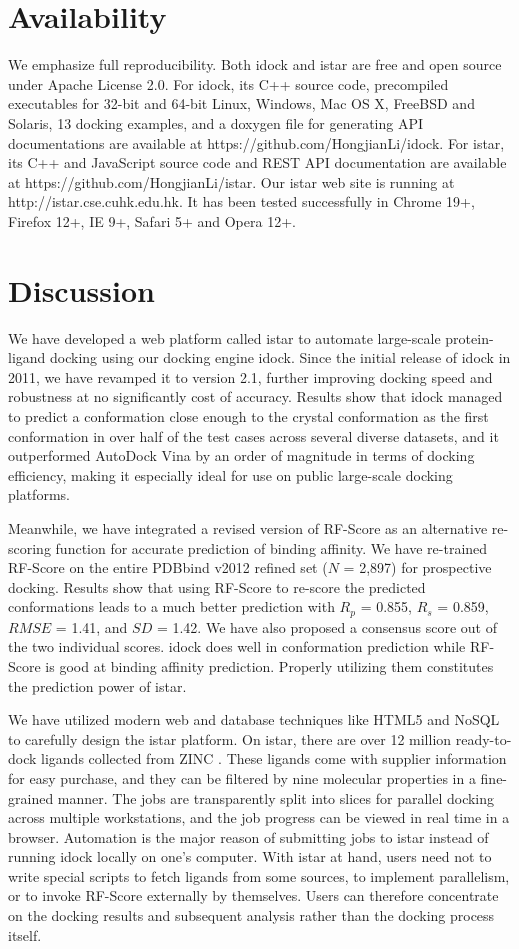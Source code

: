 \documentclass[10pt]{article}
\begin{document}
\section*{Availability}
We emphasize full reproducibility. Both idock and istar are free and open source under Apache License 2.0. For idock, its C++ source code, precompiled executables for 32-bit and 64-bit Linux, Windows, Mac OS X, FreeBSD and Solaris, 13 docking examples, and a doxygen file for generating API documentations are available at https://github.com/HongjianLi/idock. For istar, its C++ and JavaScript source code and REST API documentation are available at https://github.com/HongjianLi/istar. Our istar web site is running at http://istar.cse.cuhk.edu.hk. It has been tested successfully in Chrome 19+, Firefox 12+, IE 9+, Safari 5+ and Opera 12+.

\section*{Discussion}
We have developed a web platform called istar to automate large-scale protein-ligand docking using our docking engine idock. Since the initial release of idock in 2011, we have revamped it to version 2.1, further improving docking speed and robustness at no significantly cost of accuracy. Results show that idock managed to predict a conformation close enough to the crystal conformation as the first conformation in over half of the test cases across several diverse datasets, and it outperformed AutoDock Vina by an order of magnitude in terms of docking efficiency, making it especially ideal for use on public large-scale docking platforms.

Meanwhile, we have integrated a revised version of RF-Score as an alternative re-scoring function for accurate prediction of binding affinity. We have re-trained RF-Score on the entire PDBbind v2012 refined set ($N$ = 2,897) for prospective docking. Results show that using RF-Score to re-score the predicted conformations leads to a much better prediction with $R_p$ = 0.855, $R_s$ = 0.859, $RMSE$ = 1.41, and $SD$ = 1.42. We have also proposed a consensus score out of the two individual scores. idock does well in conformation prediction while RF-Score is good at binding affinity prediction. Properly utilizing them constitutes the prediction power of istar.

We have utilized modern web and database techniques like HTML5 and NoSQL to carefully design the istar platform. On istar, there are over 12 million ready-to-dock ligands collected from ZINC \cite{532,1178}. These ligands come with supplier information for easy purchase, and they can be filtered by nine molecular properties in a fine-grained manner. The jobs are transparently split into slices for parallel docking across multiple workstations, and the job progress can be viewed in real time in a browser. Automation is the major reason of submitting jobs to istar instead of running idock locally on one's computer. With istar at hand, users need not to write special scripts to fetch ligands from some sources, to implement parallelism, or to invoke RF-Score externally by themselves. Users can therefore concentrate on the docking results and subsequent analysis rather than the docking process itself.
\end{document}
